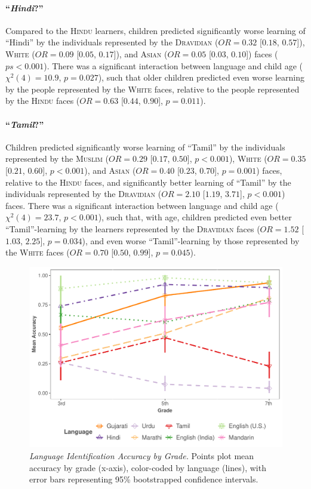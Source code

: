 \documentclass{foushee-adapted-preprint}
\begin{document}
\paragraph{``\textit{Hindi}?''}
Compared to the \textsc{Hindu} learners, children predicted significantly worse learning of ``Hindi'' by the individuals represented by the \textsc{Dravidian} ($OR=0.32$ [$0.18$, $0.57$]), \textsc{White} ($OR=0.09$ [$0.05$, $0.17$]), and \textsc{Asian} ($OR=0.05$ [$0.03$, $0.10$]) faces ($ps<0.001$). 
There was a significant interaction between language and child age ($\chi^{2}(4)=10.9$, $p=0.027$), such that older children predicted even worse learning by the people represented by the \textsc{White} faces, relative to the people represented by the \textsc{Hindu} faces ($OR=0.63$ [$0.44$, $0.90$], $p=0.011$). 

\paragraph{``\textit{Tamil}?''}
Children predicted significantly worse learning of ``Tamil'' by the individuals represented by the \textsc{Muslim} ($OR=0.29$ [$0.17$, $0.50$], $p<0.001$), \textsc{White} ($OR=0.35$ [$0.21$,  $0.60$], $p<0.001$), and \textsc{Asian} ($OR=0.40$ [$0.23$, $0.70$], $p=0.001$) faces, relative to the \textsc{Hindu} faces, and significantly better learning of ``Tamil'' by the individuals represented by the \textsc{Dravidian} ($OR=2.10$ [$1.19$, $3.71$], $p<0.001$) faces. There was a significant interaction between language and child age ($\chi^{2}(4)=23.7$, $p<0.001$), such that, with age, children predicted even better ``Tamil''-learning by the learners represented by the \textsc{Dravidian} faces ($OR=1.52$ [$1.03$, $2.25$], $p=0.034$), and even worse ``Tamil''-learning by those represented by the \textsc{White} faces ($OR=0.70$ [$0.50$, $0.99$], $p=0.045$). 
\begin{figure}
    \centering
    \includegraphics[width=.7\textwidth]{figures/std_plots/id_accuracy_std.pdf}
    \caption{\textit{Language Identification Accuracy by Grade.} Points plot mean accuracy by grade (x-axis), color-coded by language (lines), with error bars representing 95\% bootstrapped confidence intervals.}
    \label{fig:lang-id-by-std}
\end{figure}
\end{document}
